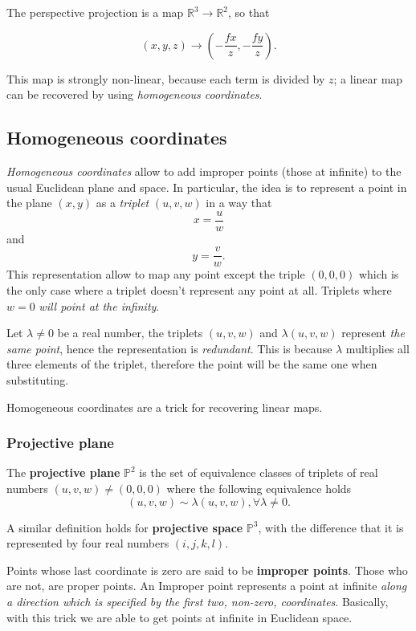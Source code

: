 \documentclass[10pt]{report}
\begin{document}
The perspective projection is a map
\(\mathbb{R}^3 \rightarrow \mathbb{R}^2\), so that

\[(x, y, z) \rightarrow (-\frac{fx}{z}, -\frac{fy}{z}).\]

This map is strongly non-linear, because each term is divided by \(z\);
a linear map can be recovered by using \emph{homogeneous coordinates}.

\subsection{Homogeneous coordinates}
\label{homogeneous-coordinates}
\emph{Homogeneous coordinates} allow to add improper points (those at
infinite) to the usual Euclidean plane and space. In particular, the
idea is to represent a point in the plane \((x, y)\) as a \emph{triplet}
\((u, v, w)\) in a way that \[x = \frac{u}{w}\] and \[y = \frac{v}{w}.\]
This representation allow to map any point except the triple \((0,0,0)\)
which is the only case where a triplet doesn't represent any point at all. Triplets where \(w=0\) \emph{will point at the infinity}.

Let \(\lambda \neq 0\) be a real number, the triplets \((u, v, w)\) and
\(\lambda(u, v, w)\) represent \emph{the same point}, hence the
representation is \emph{redundant}. This is because \(\lambda\) multiplies all three elements of the triplet, therefore the point will be the same one when substituting.

Homogeneous coordinates are a trick for recovering linear maps.

\subsubsection{Projective plane}
\label{definition-projective-plane}
The \textbf{projective plane} \(\mathbb{P}^2\) is the set of equivalence
classes of triplets of real numbers \((u, v, w) \neq (0, 0, 0)\) where
the following equivalence holds
\[(u, v, w) \sim \lambda(u, v, w), \forall \lambda \neq 0.\]

A similar definition holds for \textbf{projective space} \(\mathbb{P}^3\), with
the difference that it is represented by four real numbers
\((i, j, k, l)\).

Points whose last coordinate is zero are said to be \textbf{improper points}.
Those who are not, are proper points. An Improper point represents a point at infinite
\emph{along a direction which is specified by the first two, non-zero,
coordinates}. Basically, with this trick we are able to get points at infinite in
Euclidean space.
\end{document}
